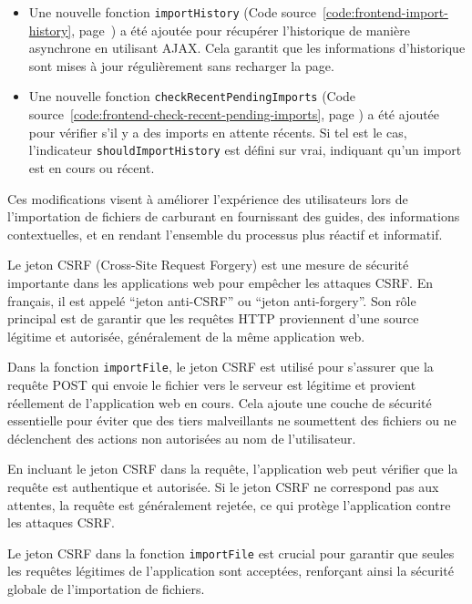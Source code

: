 \begin{itemize}
    \item Une nouvelle fonction \Verb|importHistory| (Code source~\ref{code:frontend-import-history}, page~\pageref{code:frontend-import-history}) a été ajoutée pour récupérer l'historique de manière asynchrone en utilisant AJAX. Cela garantit que les informations d'historique sont mises à jour régulièrement sans recharger la page.
    \item Une nouvelle fonction \Verb|checkRecentPendingImports|  (Code source~\ref{code:frontend-check-recent-pending-imports}, page \pageref{code:frontend-check-recent-pending-imports}) a été ajoutée pour vérifier s'il y a des imports en attente récents. Si tel est le cas, l'indicateur \Verb|shouldImportHistory| est défini sur vrai, indiquant qu'un import est en cours ou récent.
\end{itemize}

Ces modifications visent à améliorer l'expérience des utilisateurs lors de l'importation de fichiers de carburant en fournissant des guides, des informations contextuelles, et en rendant l'ensemble du processus plus réactif et informatif.

Le jeton CSRF (Cross-Site Request Forgery) est une mesure de sécurité importante dans les applications web pour empêcher les attaques CSRF. En français, il est appelé \foreignquote{french}{jeton anti-CSRF} ou \foreignquote{french}{jeton anti-forgery}. Son rôle principal est de garantir que les requêtes HTTP proviennent d'une source légitime et autorisée, généralement de la même application web.

Dans la fonction \Verb|importFile|, le jeton CSRF est utilisé pour s'assurer que la requête POST qui envoie le fichier vers le serveur est légitime et provient réellement de l'application web en cours. Cela ajoute une couche de sécurité essentielle pour éviter que des tiers malveillants ne soumettent des fichiers ou ne déclenchent des actions non autorisées au nom de l'utilisateur.

En incluant le jeton CSRF dans la requête, l'application web peut vérifier que la requête est authentique et autorisée. Si le jeton CSRF ne correspond pas aux attentes, la requête est généralement rejetée, ce qui protège l'application contre les attaques CSRF.

Le jeton CSRF dans la fonction \Verb|importFile| est crucial pour garantir que seules les requêtes légitimes de l'application sont acceptées, renforçant ainsi la sécurité globale de l'importation de fichiers.


